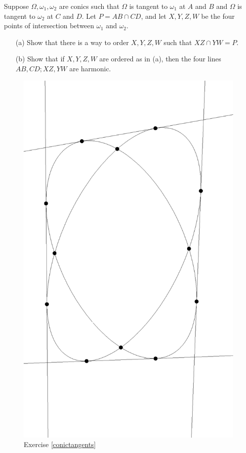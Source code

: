 \begin{exer} Suppose $\Omega, \omega_1, \omega_2$ are conics such that $\Omega$ is tangent to $\omega_1$ at $A$ and $B$ and $\Omega$ is tangent to $\omega_2$ at $C$ and $D$. Let $P = AB\cap CD$, and let $X,Y,Z,W$ be the four points of intersection between $\omega_1$ and $\omega_2$.
\begin{itemize}
\item[(a)] Show that there is a way to order $X,Y,Z,W$ such that $XZ \cap YW = P$.

\item[(b)] Show that if $X,Y,Z,W$ are ordered as in (a), then the four lines $AB, CD; XZ, YW$ are harmonic.
\end{itemize}
\end{exer}

\begin{figure}[!htb]
\centering
\includegraphics[scale=0.4,angle=270]{conictangents.eps}
\caption{Exercise \ref{conictangents}}
\end{figure}

